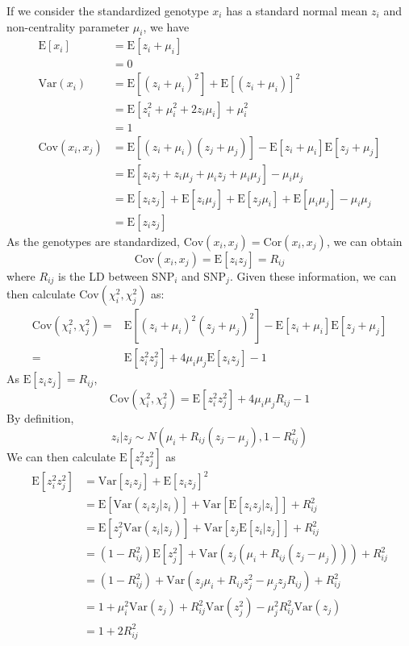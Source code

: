 			If we consider the standardized genotype $x_i$ has a standard normal mean $z_i$ and non-centrality parameter $\mu_i$, we have
			\begin{align*}
				\mathrm{E}[x_i]&=\mathrm{E}[z_i+\mu_i]\\
				&=0\\
				\mathrm{Var}(x_i) &=\mathrm{E}[(z_i+\mu_i)^2]+\mathrm{E}[(z_i+\mu_i)]^2\\
				&=\mathrm{E}[z_i^2+\mu_i^2+2z_i\mu_i]+\mu_i^2\\
				&=1 \\
				\mathrm{Cov}(x_i,x_j)&=\mathrm{E}[(z_i+\mu_i)(z_j+\mu_j)]-\mathrm{E}[z_i+\mu_i]\mathrm{E}[z_j+\mu_j]\\
				&=\mathrm{E}[z_iz_j+z_i\mu_j+\mu_iz_j+\mu_i\mu_j]-\mu_i\mu_j\\
				&=\mathrm{E}[z_iz_j]+\mathrm{E}[z_i\mu_j]+\mathrm{E}[z_j\mu_i]+\mathrm{E}[\mu_i\mu_j]-\mu_i\mu_j\\
				&=\mathrm{E}[z_iz_j]
			\end{align*}
			As the genotypes are standardized, $\mathrm{Cov}(x_i,x_j)=\mathrm{Cor}(x_i,x_j)$, we can obtain
			$$
				\mathrm{Cov}(x_i,x_j)=\mathrm{E}[z_iz_j]=R_{ij}
			$$
			where $R_{ij}$ is the \gls{LD} between \gls{SNP}$_i$ and \gls{SNP}$_j$.
			Given these information, we can then calculate $\mathrm{Cov}(\chi_i^2,\chi_j^2)$ as:
			\begin{align*}
				\mathrm{Cov}(\chi_i^2,\chi_j^2)=&\mathrm{E}[(z_i+\mu_i)^2(z_j+\mu_j)^2]-\mathrm{E}[z_i+\mu_i]\mathrm{E}[z_j+\mu_j]\\
				=&\mathrm{E}[z_i^2z_j^2]+4\mu_i\mu_j\mathrm{E}[z_iz_j]-1
			\end{align*}
			As $\mathrm{E}[z_iz_j] = R_{ij}$,
			$$
				\mathrm{Cov}(\chi_i^2, \chi_j^2)=\mathrm{E}[z_i^2z_j^2]+4\mu_i\mu_jR_{ij}-1
			$$
			By definition, 
			$$
				z_i|z_j\sim N(\mu_i+R_{ij}(z_j-\mu_j),1-R_{ij}^2)
			$$
			We can then calculate $\mathrm{E}[z_i^2z_j^2]$ as
			\begin{align*}
				\mathrm{E}[z_i^2z_j^2]&=\mathrm{Var}[z_iz_j]+\mathrm{E}[z_iz_j]^2\\
				&=\mathrm{E}[\mathrm{Var}(z_iz_j|z_i)]+\mathrm{Var}[\mathrm{E}[z_iz_j|z_i]]+R_{ij}^2\\
				&=\mathrm{E}[z_j^2\mathrm{Var}(z_i|z_j)]+\mathrm{Var}[z_j\mathrm{E}[z_i|z_j]]+R_{ij}^2\\
				&=(1-R_{ij}^2)\mathrm{E}[z_j^2]+\mathrm{Var}(z_j(\mu_i+R_{ij}(z_j-\mu_j)))+R_{ij}^2\\
				&=(1-R_{ij}^2)+\mathrm{Var}(z_j\mu_i+R_{ij}z_j^2-\mu_jz_jR_{ij})+R_{ij}^2\\
				&=1+\mu_i^2\mathrm{Var}(z_j)+R_{ij}^2\mathrm{Var}(z_j^2)-\mu_j^2R_{ij}^2\mathrm{Var}(z_j)\\
				&=1+2R_{ij}^2
			\end{align*}
